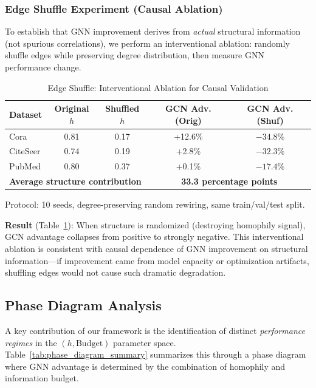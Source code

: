 \subsubsection{Edge Shuffle Experiment (Causal Ablation)}

To establish that GNN improvement derives from \textit{actual} structural information (not spurious correlations), we perform an interventional ablation: randomly shuffle edges while preserving degree distribution, then measure GNN performance change.

\begin{table}[t]
\centering
\caption{Edge Shuffle: Interventional Ablation for Causal Validation}
\label{tab:edge_shuffle_detailed}
\small
\begin{tabular}{@{}lcccc@{}}
\toprule
\textbf{Dataset} & \textbf{Original $h$} & \textbf{Shuffled $h$} & \textbf{GCN Adv. (Orig)} & \textbf{GCN Adv. (Shuf)} \\
\midrule
Cora & 0.81 & 0.17 & +12.6\% & $-34.8\%$ \\
CiteSeer & 0.74 & 0.19 & +2.8\% & $-32.3\%$ \\
PubMed & 0.80 & 0.37 & +0.1\% & $-17.4\%$ \\
\midrule
\multicolumn{3}{l}{\textbf{Average structure contribution}} & \multicolumn{2}{c}{\textbf{33.3 percentage points}} \\
\bottomrule
\end{tabular}
\vspace{1mm}
\raggedright\small Protocol: 10 seeds, degree-preserving random rewiring, same train/val/test split.
\end{table}

\textbf{Result} (Table~\ref{tab:edge_shuffle_detailed}): When structure is randomized (destroying homophily signal), GCN advantage collapses from positive to strongly negative. This interventional ablation is consistent with causal dependence of GNN improvement on structural information---if improvement came from model capacity or optimization artifacts, shuffling edges would not cause such dramatic degradation.

\subsection{Phase Diagram Analysis}

A key contribution of our framework is the identification of distinct \textit{performance regimes} in the $(h, \text{Budget})$ parameter space. Table~\ref{tab:phase_diagram_summary} summarizes this through a phase diagram where GNN advantage is determined by the combination of homophily and information budget.


